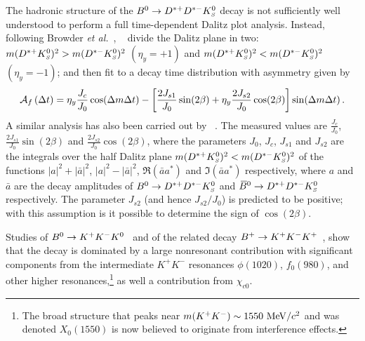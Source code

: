 \label{sec:cp_uta:notations:dalitz:dstardstarks}

The hadronic structure of the $B^0 \to D^{*+}D^{*-}K^0_{\scriptscriptstyle S}$ decay
is not sufficiently well understood to perform a full 
time-dependent Dalitz plot analysis.
Instead, following Browder {\it et al.}~\cite{Browder:1999ng},
\babar~\cite{Aubert:2006fh} divide the Dalitz plane in two:
$m(D^{*+}K^0_{\scriptscriptstyle S})^2 > m(D^{*-}K^0_{\scriptscriptstyle S})^2$ $(\eta_y = +1)$ and 
$m(D^{*+}K^0_{\scriptscriptstyle S})^2 < m(D^{*-}K^0_{\scriptscriptstyle S})^2$ $(\eta_y = -1)$;
and then fit to a decay time distribution with asymmetry given by
\begin{equation}
  {\cal A}_{f} \left(\Delta t\right) =
  \eta_y \frac{J_c}{J_0} \cos(\Delta m \Delta t) -  
  \left[ 
    \frac{2J_{s1}}{J_0} \sin(2\beta) + \eta_y \frac{2J_{s2}}{J_0} \cos(2\beta) 
  \right] \sin(\Delta m \Delta t) \, .
\end{equation}
A similar analysis has also been carried out by \belle~\cite{Dalseno:2007hx}.
The measured values are $\frac{J_c}{J_0}$, $\frac{2J_{s1}}{J_0} \sin(2\beta)$
and $\frac{2J_{s2}}{J_0} \cos(2\beta)$, 
where the parameters $J_0$, $J_c$, $J_{s1}$ and $J_{s2}$ are the integrals 
over the half Dalitz plane $m(D^{*+}K^0_{\scriptscriptstyle S})^2 < m(D^{*-}K^0_{\scriptscriptstyle S})^2$ 
of the functions $|a|^2 + |\bar{a}|^2$, $|a|^2 - |\bar{a}|^2$, 
$\Re(\bar{a}a^*)$ and $\Im(\bar{a}a^*)$ respectively, 
where $a$ and $\bar{a}$ are the decay amplitudes of 
$B^0 \to D^{*+}D^{*-}K^0_{\scriptscriptstyle S}$ and $\kern 0.18em\overline{\kern -0.18em B}{}^0 \to D^{*+}D^{*-}K^0_{\scriptscriptstyle S}$ respectively. 
The parameter $J_{s2}$ (and hence $J_{s2}/J_0$) is predicted to be positive;
with this assumption is it possible to determine the sign of $\cos(2\beta)$.

\label{sec:cp_uta:notations:dalitz:kkk0}

Studies of $B^0 \to K^+K^-K^0$~\cite{Aubert:2007sd,Nakahama:2010nj,Lees:2012kx} 
and of the related decay 
$B^{+} \to K^+K^-K^+$~\cite{Garmash:2004wa,Aubert:2006nu,Lees:2012kx},
show that the decay is dominated by a large nonresonant contribution
with significant components from the 
intermediate $K^+K^-$ resonances $\phi(1020)$, $f_0(980)$,
and other higher resonances,\footnote{
  The broad structure that peaks near 
  $m(K^+K^-) \sim 1550 \ {\rm MeV}/c^2$ and was denoted $X_0(1550)$ 
  is now believed to originate from interference effects.
}
as well a contribution from $\chi_{c0}$.

